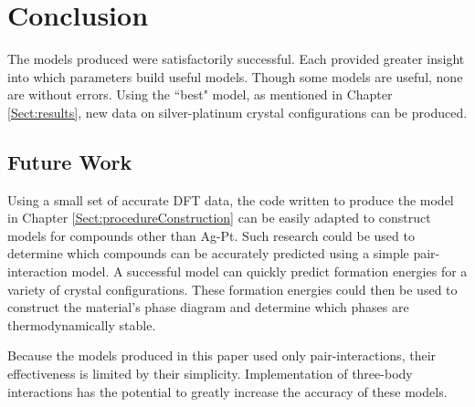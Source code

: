 \chapter{Conclusion}\label{Sect:conclusion}
\par The models produced were satisfactorily successful. Each provided greater insight into which parameters build useful models. Though some models are useful, none are without errors. Using the ``best" model, as mentioned in Chapter \ref{Sect:results}, new data on silver-platinum crystal configurations can be produced.


\section{Future Work}\label{Sect:futureWork}
\par Using a small set of accurate DFT data, the code written to produce the model in Chapter \ref{Sect:procedureConstruction} can be easily adapted to construct models for compounds other than Ag-Pt. Such research could be used to determine which compounds can be accurately predicted using a simple pair-interaction model. A successful model can quickly predict formation energies for a variety of crystal configurations. These formation energies could then be used to construct the material’s phase diagram and determine which phases are thermodynamically stable.
\par Because the models produced in this paper used only pair-interactions, their effectiveness is limited by their simplicity. Implementation of three-body interactions has the potential to greatly increase the accuracy of these models.
